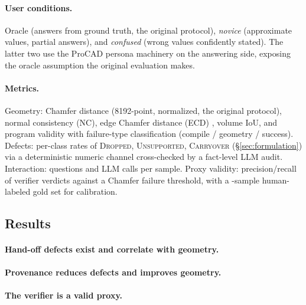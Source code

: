 \paragraph{User conditions.}
Oracle (answers from ground truth, the original protocol), \emph{novice}
(approximate values, partial answers), and \emph{confused} (wrong values
confidently stated). The latter two use the ProCAD persona machinery on the
answering side, exposing the oracle assumption the original evaluation makes.

\paragraph{Metrics.}
Geometry: Chamfer distance (8192-point, normalized, the original protocol),
normal consistency (NC), edge Chamfer distance (ECD) \cite{cadfs}, volume
IoU, and program validity with failure-type classification (compile /
geometry / success). Defects: per-class rates of \textsc{Dropped},
\textsc{Unsupported}, \textsc{Carryover} (\S\ref{sec:formulation}) via a
deterministic numeric channel cross-checked by a fact-level LLM audit.
Interaction: questions and LLM calls per sample. Proxy validity:
precision\slash recall of verifier verdicts against a Chamfer failure threshold,
with a -sample human-labeled gold set for calibration.

\subsection{Results}\label{sec:evaluation:defect}

\paragraph{Hand-off defects exist and correlate with geometry.}

\paragraph{Provenance reduces defects and improves geometry.}

\paragraph{The verifier is a valid proxy.}

